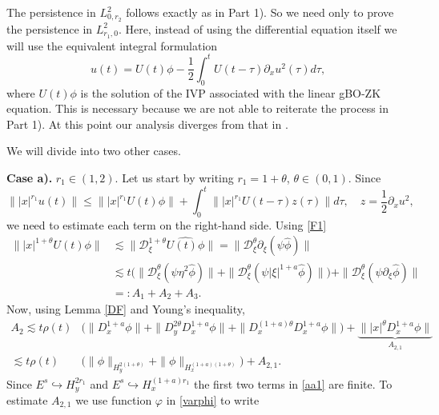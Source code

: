 \documentclass[reqno]{amsart}
\newcommand{\ha}{\hat{\phi}}
\newcommand{\p}{\partial}
\numberwithin{equation}{section}
\begin{document}
 The persistence in $L^2_{0,r_2}$ follows exactly as in Part 1). So we need only to prove the persistence in $L^2_{r_1,0}$. Here, instead of using the differential equation itself we will use the  equivalent integral formulation 
\begin{equation}\label{inteq}
u(t)=U(t)\phi -\frac12\int_{0}^{t}U(t-\tau)\partial_{x}u^2(\tau)d\tau,
\end{equation}
where $U(t)\phi$  is  the solution of the IVP associated with the linear
gBO-ZK equation. This is necessary because we are not able to reiterate the process in Part 1). At this point our analysis diverges from that in \cite{FLP1}.


 We will divide into two other cases.

\noindent  \textbf{Case a).} $r_1\in(1,2)$. Let us start by writing $r_1=1+\theta$, $\theta \in (0,1)$. Since
 \begin{equation}\label{r1int}
 \||x|^{r_1} u(t)\|\leq \||x|^{r_1} U(t)\phi\|+\int_0^t \||x|^{r_1} U(t-\tau)z(\tau)\|d\tau, \quad z=\frac12\p_x u^2,
 \end{equation}
 we need to estimate each term on the right-hand side.
 Using \eqref{F1}
 \begin{equation*}
\begin{split}
\||x|^{1+\theta}U(t)\phi\|&\lesssim \|\mathcal{D}_\xi^{1+\theta}\widehat{U(t)\phi}\|=\|\mathcal{D}_\xi^{\theta}\partial_{\xi}(\psi\hat{\phi})\| \\ 
&\lesssim t\Big (\|\mathcal{D}_\xi^\theta(\psi\eta^2 \ha)\|+\|\mathcal{D}_\xi^\theta(\psi|\xi|^{1+a} \ha)\|\Big)+\|\mathcal{D}_\xi^\theta(\psi\p_\xi \ha)\|\\
&=:A_1+A_2+A_3.
\end{split}
\end{equation*}
Now, using Lemma \ref{DF} and Young's inequality,
\begin{equation}\label{aa1}
\begin{split}
A_2 \lesssim t\rho(t)&  \Big(\|D_x^{1+a}\phi\|+\|D^{2\theta}_y D_x^{1+a} \phi\|+\|D_x^{(1+a)\theta}D_x^{1+a} \phi\|\Big)+ \underbrace{\||x|^\theta D_x^{1+a} \phi\|}_{A_{2,1}}\\
\lesssim t\rho(t)& \Big(\|\phi\|_{H_{y}^{2(1+\theta)}}+\|\phi\|_{H_x^{(1+a)(1+\theta)}}\Big)+A_{2,1}.
\end{split}
\end{equation}
Since $E^s\hookrightarrow H_y^{2r_1}$ and $E^s\hookrightarrow H_x^{(1+a)r_1}$ the first two terms in \eqref{aa1} are finite. To estimate $A_{2,1}$ we use function $\varphi$ in \eqref{varphi} to write
\end{document}
